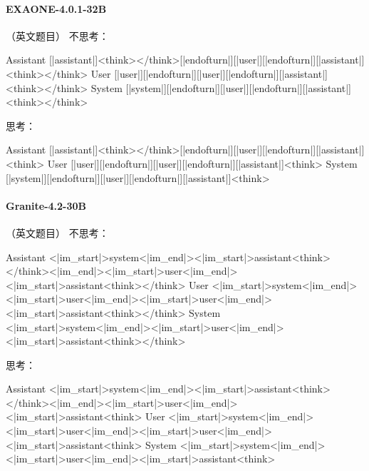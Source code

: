 \paragraph{EXAONE-4.0.1-32B} （英文题目）
\noindent 不思考：
\begin{Rendering}
Assistant  [|assistant|]\NL{}<think>\NL{}\NL{}</think>\NL{}\NL{}[|endofturn|]\NL{}[|user|]\NL{}[|endofturn|]\NL{}[|assistant|]\NL{}<think>\NL{}\NL{}</think>\NL{}\NL{}
User       [|user|]\NL{}[|endofturn|]\NL{}[|user|]\NL{}[|endofturn|]\NL{}[|assistant|]\NL{}<think>\NL{}\NL{}</think>\NL{}\NL{}
System     [|system|]\NL{}[|endofturn|]\NL{}[|user|]\NL{}[|endofturn|]\NL{}[|assistant|]\NL{}<think>\NL{}\NL{}</think>\NL{}\NL{}
\end{Rendering}
\noindent 思考：
\begin{Rendering}
Assistant  [|assistant|]\NL{}<think>\NL{}\NL{}</think>\NL{}\NL{}[|endofturn|]\NL{}[|user|]\NL{}[|endofturn|]\NL{}[|assistant|]\NL{}<think>\NL{}
User       [|user|]\NL{}[|endofturn|]\NL{}[|user|]\NL{}[|endofturn|]\NL{}[|assistant|]\NL{}<think>\NL{}
System     [|system|]\NL{}[|endofturn|]\NL{}[|user|]\NL{}[|endofturn|]\NL{}[|assistant|]\NL{}<think>\NL{}
\end{Rendering}
\paragraph{Granite-4.2-30B} （英文题目）
\noindent 不思考：
\begin{Rendering}
Assistant  <|im_start|>system\NL{}<|im_end|>\NL{}<|im_start|>assistant\NL{}<think></think><|im_end|>\NL{}<|im_start|>user\NL{}<|im_end|>\NL{}<|im_start|>assistant\NL{}<think></think>
User       <|im_start|>system\NL{}<|im_end|>\NL{}<|im_start|>user\NL{}<|im_end|>\NL{}<|im_start|>user\NL{}<|im_end|>\NL{}<|im_start|>assistant\NL{}<think></think>
System     <|im_start|>system\NL{}<|im_end|>\NL{}<|im_start|>user\NL{}<|im_end|>\NL{}<|im_start|>assistant\NL{}<think></think>
\end{Rendering}
\noindent 思考：
\begin{Rendering}
Assistant  <|im_start|>system\NL{}<|im_end|>\NL{}<|im_start|>assistant\NL{}<think></think><|im_end|>\NL{}<|im_start|>user\NL{}<|im_end|>\NL{}<|im_start|>assistant\NL{}<think>\NL{}
User       <|im_start|>system\NL{}<|im_end|>\NL{}<|im_start|>user\NL{}<|im_end|>\NL{}<|im_start|>user\NL{}<|im_end|>\NL{}<|im_start|>assistant\NL{}<think>\NL{}
System     <|im_start|>system\NL{}<|im_end|>\NL{}<|im_start|>user\NL{}<|im_end|>\NL{}<|im_start|>assistant\NL{}<think>\NL{}
\end{Rendering}
